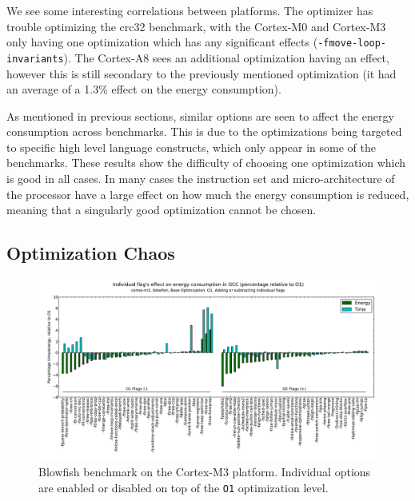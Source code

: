 \documentclass[twocolumn]{article}
\let\oldcaption\caption
\renewcommand{\caption}[1]{\oldcaption{\textup{#1}}}
\begin{document}
We see some interesting correlations between platforms. The optimizer has trouble optimizing the crc32 benchmark, with the Cortex-M0 and Cortex-M3 only having one optimization which has any significant effects (\texttt{-fmove-loop-invariants}). The Cortex-A8 sees an additional optimization having an effect, however this is still secondary to the previously mentioned optimization (it had an average of a 1.3\% effect on the energy consumption).

As mentioned in previous sections, similar options are seen to affect the energy consumption across benchmarks. This is due to the optimizations being targeted to specific high level language constructs, which only appear in some of the benchmarks. These results show the difficulty of choosing one optimization which is good in all cases. In many cases the instruction set and micro-architecture of the processor have a large effect on how much the energy consumption is reduced, meaning that a singularly good optimization cannot be chosen.

\subsection{Optimization Chaos}
\begin{figure}[t!h]
	\includegraphics[width=\linewidth,clip,trim=0.5cm 1.0cm 0cm 1.8cm]{cortex-m3/O1_addsub_blowfish.pdf}
	\caption{Blowfish benchmark on the Cortex-M3 platform. Individual options are enabled or disabled on top of the \texttt{O1} optimization level.}
	\label{Fig:AddsubO1Blowfish}
\end{figure}
\end{document}
